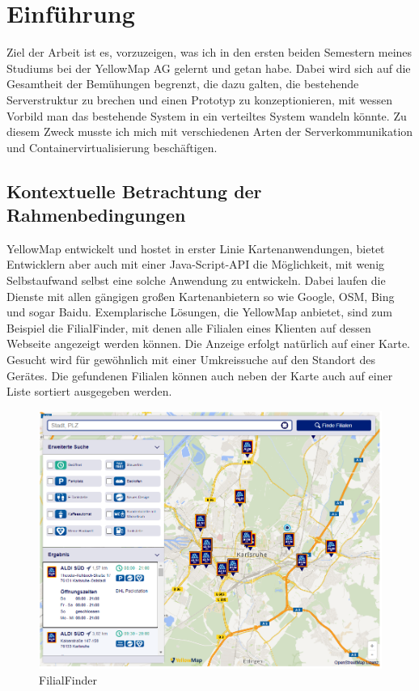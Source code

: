 \documentclass[12pt,a4paper]{scrartcl}
\begin{document}
\section{Einführung}
Ziel der Arbeit ist es, vorzuzeigen, was ich in den ersten beiden Semestern meines Studiums bei der YellowMap AG gelernt und getan habe. Dabei wird sich auf die Gesamtheit der Bemühungen begrenzt, die dazu galten, die bestehende Serverstruktur zu brechen und einen Prototyp zu konzeptionieren, mit wessen Vorbild man das bestehende System in ein verteiltes System wandeln könnte. Zu diesem Zweck musste ich mich mit verschiedenen Arten der Serverkommunikation und Containervirtualisierung beschäftigen.

\subsection{Kontextuelle Betrachtung der Rahmenbedingungen}

YellowMap\cite{yellow} entwickelt und hostet in erster Linie Kartenanwendungen, bietet Entwicklern aber auch mit einer Java-Script-\Gls{API} die Möglichkeit, mit wenig Selbstaufwand selbst eine solche Anwendung zu entwickeln\cite{yelMap}. Dabei laufen die Dienste mit allen gängigen großen Kartenanbietern so wie Google, OSM, Bing und sogar Baidu. Exemplarische Lösungen, die YellowMap anbietet, sind zum Beispiel die FilialFinder\cite{yellFF}, mit denen alle Filialen eines Klienten auf dessen Webseite angezeigt werden können. Die Anzeige erfolgt natürlich auf einer Karte. Gesucht wird für gewöhnlich mit einer Umkreissuche auf den Standort des Gerätes. Die gefundenen Filialen können auch neben der Karte auch auf einer Liste sortiert ausgegeben werden.

\begin{figure}[h!]
	\centering
	\includegraphics[scale=0.55]{YmFF.png}
	\caption[https://www.aldi-sued.de/filialen/ (Stand 28.08.2020)]{FilialFinder}
\end{figure}
\end{document}
